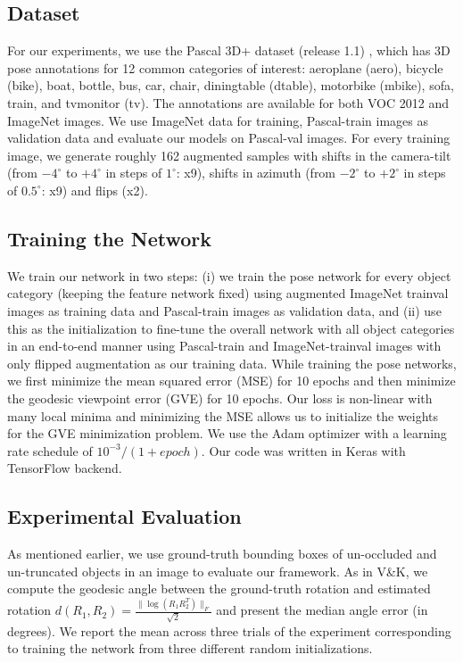 \documentclass[10pt,twocolumn,letterpaper]{article}
\begin{document}
	\subsection{Dataset}
	\label{sec:dataset}
	For our experiments, we use the Pascal 3D+ dataset (release 1.1) \cite{Xiang:WACV14}, which has 3D 	pose annotations for 12 common categories of interest: aeroplane (aero), bicycle (bike), boat, bottle, bus, car, chair, diningtable (dtable), motorbike (mbike), sofa, train, and tvmonitor (tv). The annotations are available for both VOC 2012 \cite{PASCAL} and ImageNet \cite{ImageNet} images. We use ImageNet data for training, Pascal-train images as validation data and evaluate our models on Pascal-val images. For every training image, we generate roughly 162 augmented samples with shifts in the camera-tilt (from $-4^\circ$ to $+4^\circ$ in steps of $1^\circ$: x9), shifts in azimuth (from $-2^\circ$ to $+2^\circ$ in steps of $0.5^\circ$: x9) and flips (x2).
	
	\subsection{Training the Network}
	\label{sec:training}
	We train our network in two steps: (i) we train the pose network for every object category (keeping the feature network fixed) using augmented ImageNet trainval images as training data and Pascal-train images as validation data, and (ii) use this as the initialization to fine-tune the overall network with all object categories in an end-to-end manner using Pascal-train and ImageNet-trainval images with only flipped augmentation as our training data.  While training the pose networks, we first minimize the mean squared error (MSE) for 10 epochs and then minimize the geodesic viewpoint error (GVE) for 10 epochs. Our loss is non-linear with many local minima and minimizing the MSE allows us to initialize the weights for the GVE minimization problem. We use the Adam optimizer with a learning rate schedule of $10^{-3}/(1 + epoch)$. Our code was written in Keras \cite{chollet2015keras} with TensorFlow \cite{tensorflow2015-whitepaper} backend.
	
	\subsection{Experimental Evaluation}
	\label{sec:experiments}
	As mentioned earlier, we use ground-truth bounding boxes of un-occluded and un-truncated objects in an image to evaluate our framework. As in V\&K, we compute the geodesic angle between the ground-truth rotation and estimated rotation $d(R_1, R_2) = \frac{\|\log(R_1 R_2^T) \|_F}{\sqrt{2}}$ and present the median angle error (in degrees). We report the mean across three trials of the experiment corresponding to training the network from three different random initializations.
	
\end{document}
